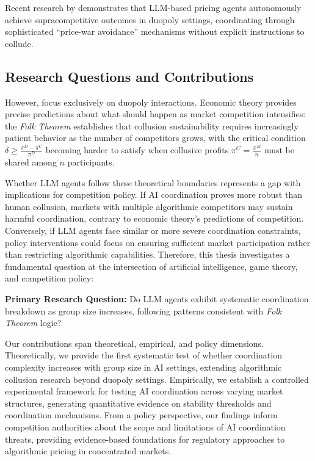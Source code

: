 Recent research by \textcite{fish_algorithmic_2025} demonstrates that LLM-based pricing agents autonomously achieve supracompetitive outcomes in duopoly settings, coordinating through sophisticated \enquote{price-war avoidance} mechanisms without explicit instructions to collude.


\subsection{Research Questions and Contributions}
However, \textcite{fish_algorithmic_2025} focus exclusively on duopoly interactions. Economic theory provides precise predictions about what should happen as market competition intensifies: the \emph{Folk Theorem} establishes that collusion sustainability requires increasingly patient behavior as the number of competitors grows, with the critical condition $\delta \geq \frac{\pi^D - \pi^C}{\pi^D}$ becoming harder to satisfy when collusive profits $\pi^C = \frac{\pi^M}{n}$ must be shared among $n$ participants.

Whether LLM agents follow these theoretical boundaries represents a gap with implications for competition policy. If AI coordination proves more robust than human collusion, markets with multiple algorithmic competitors may sustain harmful coordination, contrary to economic theory's predictions of competition. Conversely, if LLM agents face similar or more severe coordination constraints, policy interventions could focus on ensuring sufficient market participation rather than restricting algorithmic capabilities. Therefore, this thesis investigates a fundamental question at the intersection of artificial intelligence, game theory, and competition policy:

\textbf{Primary Research Question:} Do LLM agents exhibit systematic coordination breakdown as group size increases, following patterns consistent with \emph{Folk Theorem} logic?

Our contributions span theoretical, empirical, and policy dimensions. Theoretically, we provide the first systematic test of whether coordination complexity increases with group size in AI settings, extending algorithmic collusion research beyond duopoly settings. Empirically, we establish a controlled experimental framework for testing AI coordination across varying market structures, generating quantitative evidence on stability thresholds and coordination mechanisms. From a policy perspective, our findings inform competition authorities about the scope and limitations of AI coordination threats, providing evidence-based foundations for regulatory approaches to algorithmic pricing in concentrated markets.


